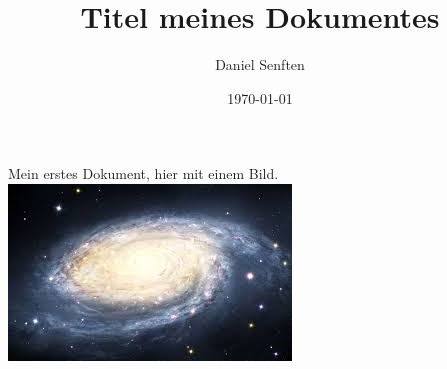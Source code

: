 \documentclass{manual}
\title{Titel meines Dokumentes}
\author{Daniel Senften}
\date{\today}
\begin{document}
    Mein erstes Dokument, hier mit einem Bild.
    \includegraphics{images/universe}
\end{document}

